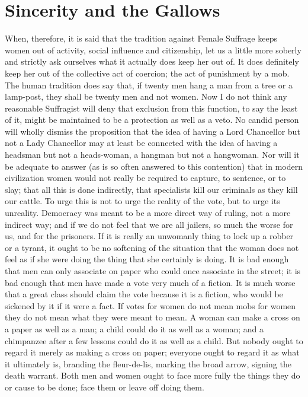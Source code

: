 \documentclass{book}
\begin{document}
\chapter{Sincerity and the Gallows}
\label{chapter-27}
When, therefore, it is said that the tradition against Female Suffrage keeps women out of activity, social influence and citizenship, let us a little more soberly and strictly ask ourselves what it actually does keep her out of. It does definitely keep her out of the collective act of coercion; the act of punishment by a mob. The human tradition does say that, if twenty men hang a man from a tree or a lamp-post, they shall be twenty men and not women. Now I do not think any reasonable Suffragist will deny that exclusion from this function, to say the least of it, might be maintained to be a protection as well as a veto. No candid person will wholly dismiss the proposition that the idea of having a Lord Chancellor but not a Lady Chancellor may at least be connected with the idea of having a headsman but not a heads-woman, a hangman but not a hangwoman. Nor will it be adequate to answer (as is so often answered to this contention) that in modern civilization women would not really be required to capture, to sentence, or to slay; that all this is done indirectly, that specialists kill our criminals as they kill our cattle. To urge this is not to urge the reality of the vote, but to urge its unreality. Democracy was meant to be a more direct way of ruling, not a more indirect way; and if we do not feel that we are all jailers, so much the worse for us, and for the prisoners. If it is really an unwomanly thing to lock up a robber or a tyrant, it ought to be no softening of the situation that the woman does not feel as if she were doing the thing that she certainly is doing. It is bad enough that men can only associate on paper who could once associate in the street; it is bad enough that men have made a vote very much of a fiction. It is much worse that a great class should claim the vote because it is a fiction, who would be sickened by it if it were a fact. If votes for women do not mean mobs for women they do not mean what they were meant to mean. A woman can make a cross on a paper as well as a man; a child could do it as well as a woman; and a chimpanzee after a few lessons could do it as well as a child. But nobody ought to regard it merely as making a cross on paper; everyone ought to regard it as what it ultimately is, branding the fleur-de-lis, marking the broad arrow, signing the death warrant. Both men and women ought to face more fully the things they do or cause to be done; face them or leave off doing them.
\end{document}
